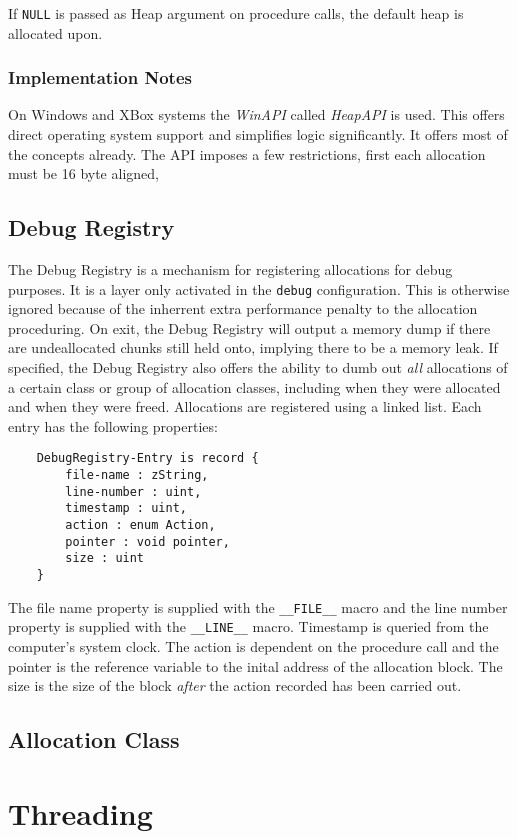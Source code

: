 \documentclass{report}
\begin{document}
If \texttt{NULL} is passed as Heap argument on procedure calls, the default heap is allocated upon.

\subsection{Implementation Notes}
On Windows and XBox systems the \emph{WinAPI} called \emph{HeapAPI} is used. 
This offers direct operating system support and simplifies logic significantly.
It offers most of the concepts already. 
The API imposes a few restrictions, first each allocation must be 16 byte aligned, 

\section{Debug Registry}
The Debug Registry is a mechanism for registering allocations for debug purposes. 
It is a layer only activated in the \texttt{debug} configuration.
This is otherwise ignored because of the inherrent extra performance penalty to the allocation proceduring.
On exit, the Debug Registry will output a memory dump if there are undeallocated chunks still held onto, implying there to be a memory leak.
If specified, the Debug Registry also offers the ability to dumb out \emph{all} allocations of a certain class or group of allocation classes, including when they were allocated and when they were freed.
Allocations are registered using a linked list. Each entry has the following properties:
\begin{verbatim}
    DebugRegistry-Entry is record {
        file-name : zString,
        line-number : uint,
        timestamp : uint,
        action : enum Action,
        pointer : void pointer,
        size : uint
    }
\end{verbatim}
The file name property is supplied with the \texttt{\_\_FILE\_\_} macro and the line number property is supplied with the \texttt{\_\_LINE\_\_} macro.
Timestamp is queried from the computer's system clock.
The action is dependent on the procedure call and the pointer is the reference variable to the inital address of the allocation block.
The size is the size of the block \emph{after} the action recorded has been carried out.



\section{Allocation Class}






\chapter{Threading}
\end{document}
